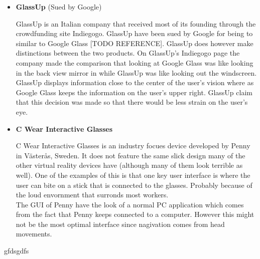 \begin{itemize}
\item \textbf{GlassUp}\cite{glassUp} (Sued by Google)

GlassUp is an Italian company that received most of its founding through the crowdfunding site Indiegogo.\cite{glassUpIndiegogo} GlassUp have been sued by Google for being to similar to Google Glass [TODO REFERENCE]. GlassUp does however make distinctions between the two products. On GlassUp's Indiegogo page the company made the comparison that looking at Google Glass was like looking in the back view mirror in while GlassUp was like looking out the windscreen.\\

GlassUp displays information close to the center of the user's vision where as Google Glass keeps the information on the user's upper right. GlassUp claim that this decision was made so that there would be less strain on the user's eye.\\

\item \textbf{C Wear Interactive Glasses}\cite{penny}

C Wear Interactive Glasses is an industry focues device developed by Penny in V{\"a}ster{\aa}s, Sweden. It does not feature the same slick design many of the other virtual reality devices have (although many of them look terrible as well). One of the examples of this is that one key user interface is where the user can bite on a stick that is connected to the glasses. Probably because of the loud envornment that surronds most workers.\\

The GUI of Penny have the look of a normal PC application which comes from the fact that Penny keeps connected to a computer. However this might not be the most optimal interface since nagivation comes from head movements.
\end{itemize}
gfdsgdfs
\\
